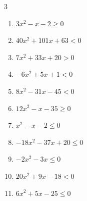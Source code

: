 \begin{multicols}{3}
\begin{enumerate}

  \item $3x^{2}-x-2\geq 0$


  \item $40x^{2}+101x+63<0$


  \item $7x^{2}+33x+20>0$


  \item $-6x^{2}+5x+1<0$


\columnbreak %

\resetques

  \item $8x^{2}-31x-45<0$


  \item $12x^{2}-x-35\geq 0$


  \item $x^{2}-x-2\leq 0$

        \phantom{$\displaystyle -1 \leqq x \leqq 2$}

  \item $-18x^{2}-37x+20\leq 0$


  \item $-2x^{2}-3x\leq 0$


  \item $20x^{2}+9x-18<0$


  \item $6x^{2}+5x-25\leq 0$



\end{enumerate}
\end{multicols}
